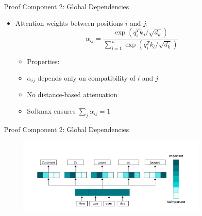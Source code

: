 \documentclass[serif, aspectratio=169]{beamer}
\begin{document}
\begin{frame}{Proof Component 2: Global Dependencies}
    \begin{itemize}
        \item Attention weights between positions $i$ and $j$:
        \begin{equation*}
            \alpha_{ij} = \frac{\exp(q_i^Tk_j/\sqrt{d_k})}{\sum_{l=1}^n \exp(q_i^Tk_l/\sqrt{d_k})}
        \end{equation*}
        \begin{itemize}
            \item Properties:
            \item $\alpha_{ij}$ depends only on compatibility of $i$ and $j$
            \item No distance-based attenuation
            \item Softmax ensures $\sum_j \alpha_{ij} = 1$
        \end{itemize}
    \end{itemize}
\end{frame}

\begin{frame}{Proof Component 2: Global Dependencies}
        \begin{figure}
        \centering
        \includegraphics[width=0.85\textwidth]{pic/attention-weights.png}
    \end{figure}
\end{frame}
\end{document}
